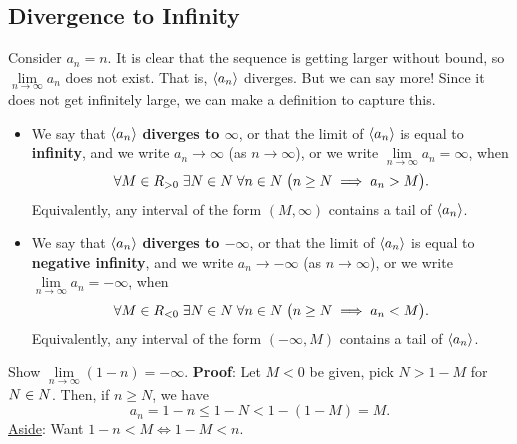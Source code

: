 \subsection{Divergence to Infinity}
Consider $ a_n=n $. It is clear that the sequence is getting larger without bound, so $ \lim\limits_{{n} \to {\infty}}a_n $
does not exist. That is, $ \langle a_n\rangle $ diverges. But we can say more! Since it does not get infinitely large,
we can make a definition to capture this.
\begin{Definition}{}{}
    \begin{itemize}
        \item We say that $ \langle a_n\rangle $ \textbf{diverges to $ \infty $}, or that the limit of $ \langle a_n\rangle $ is equal to \textbf{infinity}, and we write
              $ a_n\to \infty $ (as $ n\to\infty $), or we write $ \lim\limits_{{n} \to {\infty}}a_n=\infty $, when
              \[ \forall M\in\relax{R}_{>0}\; \exists N\in\relax{N}\;\forall n\in \relax{N}\; \bigl(n\ge N\implies a_n>M\bigr). \]
              Equivalently, any interval of the form $ (M,\infty) $ contains a tail of $ \langle a_n\rangle $.
        \item We say that $ \langle a_n\rangle $ \textbf{diverges to $ -\infty $}, or that the limit of $ \langle a_n\rangle $ is equal to
              \textbf{negative infinity}, and we write
              $ a_n\to -\infty $ (as $ n\to\infty $), or we write $ \lim\limits_{{n} \to {\infty}}a_n=-\infty $, when
              \[ \forall M\in\relax{R}_{<0}\; \exists N\in\relax{N}\;\forall n\in \relax{N}\; \bigl(n\ge N\implies a_n<M\bigr). \]
              Equivalently, any interval of the form $ (-\infty,M) $ contains a tail of $ \langle a_n\rangle $.
    \end{itemize}
\end{Definition}
\begin{Example}{}{}
    Show $ \lim\limits_{{n} \to {\infty}}(1-n)=-\infty $.
    \tcblower{}
    \textbf{Proof}: Let $ M<0 $ be given, pick $ N>1-M $ for $ N\in\relax{N} $. Then, if $ n\ge N $, we have
    \[ a_n=1-n\le 1-N<1-(1-M)=M. \]
    \underline{Aside}: Want $ 1-n<M\iff 1-M<n $.
\end{Example}